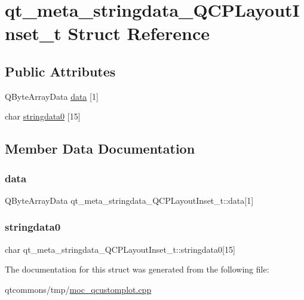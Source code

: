 \hypertarget{structqt__meta__stringdata___q_c_p_layout_inset__t}{}\section{qt\+\_\+meta\+\_\+stringdata\+\_\+\+Q\+C\+P\+Layout\+Inset\+\_\+t Struct Reference}
\label{structqt__meta__stringdata___q_c_p_layout_inset__t}
\subsection*{Public Attributes}
\begin{DoxyCompactItemize}
\item 
Q\+Byte\+Array\+Data \mbox{\hyperlink{structqt__meta__stringdata___q_c_p_layout_inset__t_a0e49734388df5561af73e1227783876f}{data}} \mbox{[}1\mbox{]}
\item 
char \mbox{\hyperlink{structqt__meta__stringdata___q_c_p_layout_inset__t_ab4f1548deeaa218ec41795dd946a09ef}{stringdata0}} \mbox{[}15\mbox{]}
\end{DoxyCompactItemize}


\subsection{Member Data Documentation}
\mbox{\label{structqt__meta__stringdata___q_c_p_layout_inset__t_a0e49734388df5561af73e1227783876f}} 
\subsubsection{\texorpdfstring{data}{data}}
{\footnotesize\ttfamily Q\+Byte\+Array\+Data qt\+\_\+meta\+\_\+stringdata\+\_\+\+Q\+C\+P\+Layout\+Inset\+\_\+t\+::data\mbox{[}1\mbox{]}}

\mbox{\label{structqt__meta__stringdata___q_c_p_layout_inset__t_ab4f1548deeaa218ec41795dd946a09ef}} 
\subsubsection{\texorpdfstring{stringdata0}{stringdata0}}
{\footnotesize\ttfamily char qt\+\_\+meta\+\_\+stringdata\+\_\+\+Q\+C\+P\+Layout\+Inset\+\_\+t\+::stringdata0\mbox{[}15\mbox{]}}



The documentation for this struct was generated from the following file\+:\begin{DoxyCompactItemize}
\item 
qtcommons/tmp/\mbox{\hyperlink{moc__qcustomplot_8cpp}{moc\+\_\+qcustomplot.\+cpp}}\end{DoxyCompactItemize}
